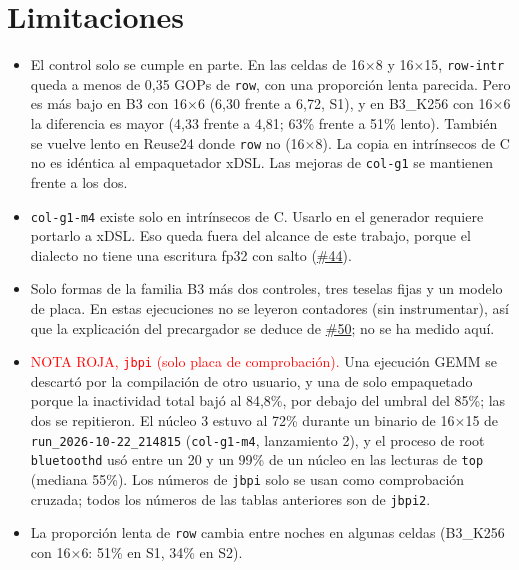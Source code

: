\documentclass[10pt,a4paper]{article}
\newcommand{\iss}[1]{\href{https://github.com/JieGH/RVV_code_gen_via_MLIR_xDSL/issues/#1}{\##1}}
\begin{document}
\section{Limitaciones}
\begin{itemize}
  \item El control solo se cumple en parte. En las celdas de 16$\times$8 y 16$\times$15, \texttt{row-intr} queda a menos de 0,35 GOPs
  de \texttt{row}, con una proporción lenta parecida. Pero es más bajo en B3 con 16$\times$6 (6,30 frente a 6,72, S1), y en B3\_K256
  con 16$\times$6 la diferencia es mayor (4,33 frente a 4,81; 63\% frente a 51\% lento). También se vuelve lento en Reuse24 donde
  \texttt{row} no (16$\times$8). La copia en intrínsecos de C no es idéntica al empaquetador xDSL. Las mejoras de \texttt{col-g1} se
  mantienen frente a los dos.
  \item \texttt{col-g1-m4} existe solo en intrínsecos de C. Usarlo en el generador requiere portarlo a xDSL. Eso queda fuera del
  alcance de este trabajo, porque el dialecto no tiene una escritura fp32 con salto (\iss{44}).
  \item Solo formas de la familia B3 más dos controles, tres teselas fijas y un modelo de placa. En estas ejecuciones no se leyeron
  contadores (sin instrumentar), así que la explicación del precargador se deduce de \iss{50}; no se ha medido aquí.
  \item \textcolor{red}{NOTA ROJA, \texttt{jbpi} (solo placa de comprobación).} Una ejecución GEMM se descartó por la compilación de
  otro usuario, y una de solo empaquetado porque la inactividad total bajó al 84,8\%, por debajo del umbral del 85\%; las dos se
  repitieron. El núcleo 3 estuvo al 72\% durante un binario de 16$\times$15 de \texttt{run\_2026-10-22\_214815} (\texttt{col-g1-m4},
  lanzamiento 2), y el proceso de root \texttt{bluetoothd} usó entre un 20 y un 99\% de un núcleo en las lecturas de \texttt{top}
  (mediana 55\%). Los números de \texttt{jbpi} solo se usan como comprobación cruzada; todos los números de las tablas anteriores son
  de \texttt{jbpi2}.
  \item La proporción lenta de \texttt{row} cambia entre noches en algunas celdas (B3\_K256 con 16$\times$6: 51\% en S1, 34\% en S2).
\end{itemize}
\end{document}
